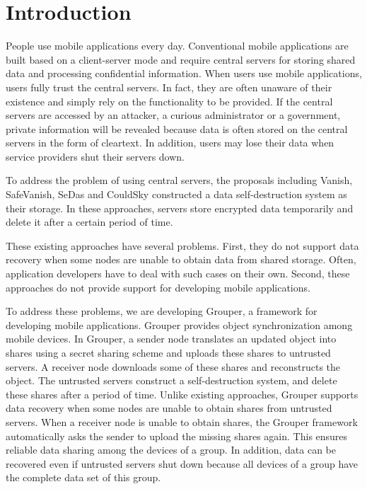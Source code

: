 \documentclass[sigconf]{acmart}
\begin{document}
\section{Introduction}

People use mobile applications every day. 
Conventional mobile applications are built based on a client-server mode and require central servers for storing shared data and processing confidential information.
When users use mobile applications, users fully trust the central servers.
In fact, they are often unaware of their existence and simply rely on the functionality to be provided.
If the central servers are accessed by an attacker, a curious administrator or a government, private information will be revealed because data is often stored on the central servers in the form of cleartext.
In addition, users may lose their data when service providers shut their servers down.

To address the problem of using central servers, the proposals including Vanish\cite{geambasu2009vanish}, SafeVanish\cite{zeng2010safevanish}, SeDas\cite{zeng2012sedas} and CouldSky\cite{zeng2015cloudsky} constructed a data self-destruction system as their storage.
In these approaches, servers store encrypted data temporarily and delete it after a certain period of time.

These existing approaches have several problems.
First, they do not support data recovery when some nodes are unable to obtain data from shared storage.
Often, application developers have to deal with such cases on their own.
Second, these approaches do not provide support for developing mobile applications.

To address these problems, we are developing Grouper, a framework for developing mobile applications. 
Grouper provides object synchronization among mobile devices.
In Grouper, a sender node translates an updated object into shares using a secret sharing scheme and uploads these shares to untrusted servers. 
A receiver node downloads some of these shares and reconstructs the object.
The untrusted servers construct a self-destruction system, and delete these shares after a period of time.
Unlike existing approaches, Grouper supports data recovery when some nodes are unable to obtain shares from untrusted servers.
When a receiver node is unable to obtain shares, the Grouper framework automatically asks the sender to upload the missing shares again.
This ensures reliable data sharing among the devices of a group.
In addition, data can be recovered even if untrusted servers shut down because all devices of a group have the complete data set of this group.
\end{document}
